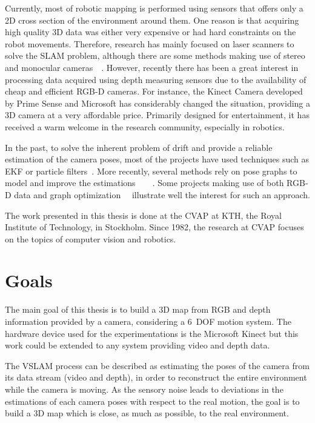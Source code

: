 Currently, most of robotic mapping is performed using sensors that offers only a 2D cross section of the environment around them. One reason is that acquiring high quality 3D data was either very expensive or had hard constraints on the robot movements. Therefore, research has mainly focused on laser scanners to solve the \gls{SLAM} problem, although there are some methods making use of stereo and monocular cameras~\cite{KonoligeA08}~\cite{StrasdatMD10}. However, recently there has been a great interest in processing data acquired using depth measuring sensors due to the availability of cheap and efficient RGB-D cameras. For instance, the Kinect Camera developed by Prime Sense and Microsoft has considerably changed the situation, providing a 3D camera at a very affordable price. Primarily designed for entertainment, it has received a warm welcome in the research community, especially in robotics.

In the past, to solve the inherent problem of drift and provide a reliable estimation of the camera poses, most of the projects have used techniques such as \gls{EKF} or particle filters~\cite{Thrun_2005}. More recently, several methods rely on pose graphs to model and improve the estimations~\cite{Thrun05_GraphSLAM}~\cite{grisetti07rss}~\cite{g2o_2011}~\cite{hogman_2010}. Some projects making use of both RGB-D data and graph optimization~\cite{Henry_RGBD_2010}~\cite{engelhard11euron-workshop} illustrate well the interest for such an approach.

The work presented in this thesis is done at the \gls{CVAP} at KTH, the Royal Institute of Technology, in Stockholm. Since 1982, the research at \gls{CVAP} focuses on the topics of computer vision and robotics. 

\clearpage
\section{Goals}

The main goal of this thesis is to build a 3D map from RGB and depth information provided by a camera, considering a 6~\gls{DOF} motion system. The hardware device used for the experimentations is the Microsoft Kinect but this work could be extended to any system providing video and depth data.

The \gls{VSLAM} process can be described as estimating the poses of the camera from its data stream (video and depth), in order to reconstruct the entire environment while the camera is moving. As the sensory noise leads to deviations in the estimations of each camera poses with respect to the real motion, the goal is to build a 3D map which is close, as much as possible, to the real environment.


